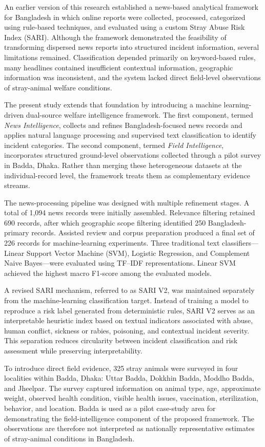\documentclass[conference]{IEEEtran}
\begin{document}
An earlier version of this research established a news-based analytical
framework for Bangladesh in which online reports were collected, processed,
categorized using rule-based techniques, and evaluated using a custom Stray
Abuse Risk Index (SARI). Although the framework demonstrated the feasibility
of transforming dispersed news reports into structured incident information,
several limitations remained. Classification depended primarily on
keyword-based rules, many headlines contained insufficient contextual
information, geographic information was inconsistent, and the system lacked
direct field-level observations of stray-animal welfare conditions.

The present study extends that foundation by introducing a machine
learning-driven dual-source welfare intelligence framework. The first
component, termed \textit{News Intelligence}, collects and refines
Bangladesh-focused news records and applies natural language processing and
supervised text classification to identify incident categories. The second
component, termed \textit{Field Intelligence}, incorporates structured
ground-level observations collected through a pilot survey in Badda, Dhaka.
Rather than merging these heterogeneous datasets at the individual-record
level, the framework treats them as complementary evidence streams.

The news-processing pipeline was designed with multiple refinement stages.
A total of 1,094 news records were initially assembled. Relevance filtering
retained 690 records, after which geographic scope filtering identified 250
Bangladesh-primary records. Assisted review and corpus preparation produced a
final set of 226 records for machine-learning experiments. Three traditional
text classifiers---Linear Support Vector Machine (SVM), Logistic Regression,
and Complement Naive Bayes---were evaluated using TF--IDF representations.
Linear SVM achieved the highest macro F1-score among the evaluated models.

A revised SARI mechanism, referred to as SARI V2, was maintained separately
from the machine-learning classification target. Instead of training a model
to reproduce a risk label generated from deterministic rules, SARI V2 serves
as an interpretable heuristic index based on textual indicators associated
with abuse, human conflict, sickness or rabies, poisoning, and contextual
incident severity. This separation reduces circularity between incident
classification and risk assessment while preserving interpretability.

To introduce direct field evidence, 325 stray animals were surveyed in four
localities within Badda, Dhaka: Uttar Badda, Dokkhin Badda, Moddho Badda, and
Jheelpar. The survey captured information on animal type, age, approximate
weight, observed health condition, visible health issues, vaccination,
sterilization, behavior, and location. Badda is used as a pilot case-study
area for demonstrating the field-intelligence component of the proposed
framework. The observations are therefore not interpreted as nationally
representative estimates of stray-animal conditions in Bangladesh.
\end{document}
